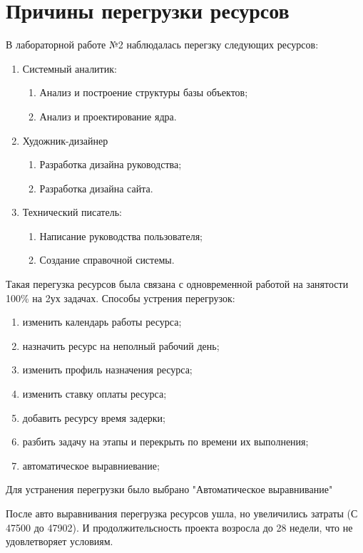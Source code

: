 \section{Причины перегрузки ресурсов}
В лабораторной работе №2 наблюдалась перегзку следующих ресурсов:
\begin{enumerate}
	\item Системный аналитик:
	\begin{enumerate}
		\item Анализ и построение структуры базы объектов;
		\item Анализ и проектирование ядра.
	\end{enumerate}
	\item Художник-дизайнер
	\begin{enumerate}
		\item Разработка дизайна руководства;
		\item Разработка дизайна сайта.
	\end{enumerate}
	\item Технический писатель:
	\begin{enumerate}
		\item Написание руководства пользователя;
		\item Создание справочной системы.
	\end{enumerate}
\end{enumerate}

Такая перегузка ресурсов была связана с одновременной работой на занятости 100\% на 2ух задачах.
Способы устрения перегрузок: 
\begin{enumerate}
	\item изменить календарь работы ресурса;
	\item назначить ресурс на неполный рабочий день;
	\item изменить профиль назначения ресурса;
	\item изменить ставку оплаты ресурса;
	\item добавить ресурсу время задерки;
	\item разбить задачу на этапы и перекрыть по времени их выполнения;
	\item автоматическое выравниевание;
\end{enumerate}

Для устранения перегрузки было выбрано "Автоматическое выравнивание"

После авто выравнивания перегрузка ресурсов ушла, но увеличились затраты (С 47500 до 47902).
И продолжительсность проекта возросла до 28 недели, что не удовлетворяет условиям.

